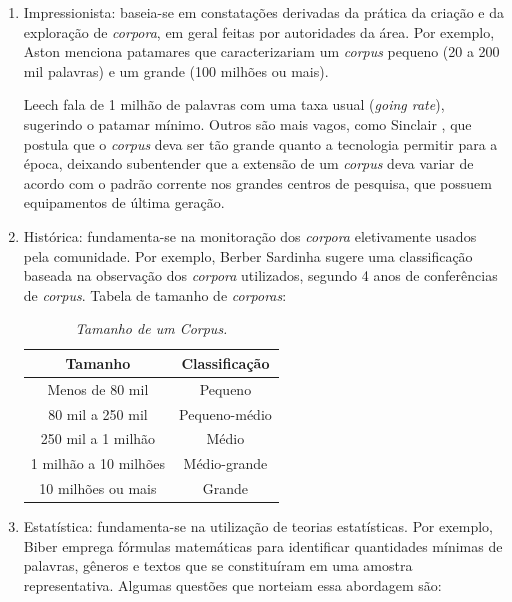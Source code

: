 \begin{enumerate}
\item Impressionista: baseia-se em constatações derivadas da prática da criação e da exploração de \emph{corpora}, em geral feitas por autoridades da área. Por exemplo, Aston \cite{aston97} menciona patamares que caracterizariam um \emph{corpus} pequeno (20 a 200 mil palavras) e um grande (100 milhões ou mais).

Leech \cite{leech91} fala de 1 milhão de palavras com uma taxa usual (\emph{going rate}), sugerindo o patamar mínimo. Outros são mais vagos, como Sinclair \cite{sinclair97}, que postula que o \emph{corpus} deva ser tão grande quanto a tecnologia permitir para a época, deixando subentender que a extensão de um \emph{corpus} deva variar de acordo com o padrão corrente nos grandes centros de pesquisa, que possuem equipamentos de última geração.

\item Histórica: fundamenta-se na monitoração dos \emph{corpora} eletivamente usados pela comunidade. Por exemplo, Berber Sardinha \cite{sardinha04} sugere uma classificação baseada na observação dos \emph{corpora} utilizados, segundo 4 anos de conferências de \emph{corpus}. Tabela de tamanho de \emph{corporas}:
\\

\begin{table}
   \centering
   \small
   \caption{\it Tamanho de um \emph{Corpus}.}

   \begin{tabular}{| c | c |}
      \hline
        \textbf{Tamanho} & \textbf{Classificação}\\
        \hline
        \hline
        Menos de 80 mil & Pequeno\\
        \hline
        80 mil a 250 mil & Pequeno-médio\\
        \hline
        250 mil a 1 milhão & Médio\\
        \hline
        1 milhão a 10 milhões & Médio-grande\\
        \hline
        10 milhões ou mais & Grande\\
        \hline

   \end{tabular}

\end{table}


\item Estatística: fundamenta-se na utilização de teorias estatísticas. Por exemplo, Biber \cite{biber93} emprega fórmulas matemáticas para identificar quantidades mínimas de palavras, gêneros e textos que se constituíram em uma amostra representativa. Algumas questões que norteiam essa abordagem são:


\end{enumerate}
